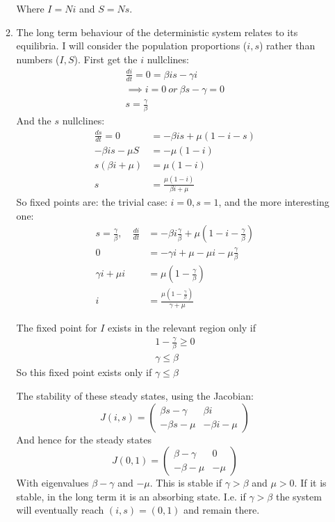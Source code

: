 \documentclass{/home/janmebows/Documents/LatexTemplates/myassignment}
\newcommand{\odd}[2]{\frac{d#1}{d#2}}
\begin{document}
\begin{enumerate}
\begin{enumerate}[label=(\roman*)]
		Where $I = Ni$ and $S = Ns$.
		\item %
			The long term behaviour of the deterministic system relates to its equilibria. I will consider the population proportions ($i,s$) rather than numbers ($I,S$).
			First get the $i$ nullclines:
			\begin{align*}
				\odd it = 0=\beta is -\gamma i\\
				\implies i=0 \ or \ \beta s - \gamma =0\\
				s = \frac{\gamma}{\beta}
			\end{align*}
			And the $s$ nullclines:
			\begin{align*}
				\odd st = 0 &= -\beta is+ \mu(1-i-s)\\
				-\beta is - \mu S &= -\mu(1-i)\\
				s(\beta i + \mu) &= \mu(1-i)\\
				s &= \frac{\mu(1-i)}{\beta i + \mu}
			\end{align*}
			So fixed points are: the trivial case: $i=0, s=1$, and the more interesting one:
			\begin{align*}
				s = \frac{\gamma}{\beta}, \quad \odd it &= -\beta i\frac{\gamma}{\beta} + \mu(1-i-\frac{\gamma}{\beta})\\
				0 &=-\gamma i + \mu  - \mu i - \mu\frac{\gamma}{\beta}\\
				\gamma i + \mu i &= \mu(1 - \frac{\gamma}{\beta})\\
				i &= \frac{\mu\left(1 - \frac{\gamma}{\beta}\right)}{\gamma + \mu}
			\end{align*}
			
			The fixed point for $I$ exists in the relevant region only if
			\begin{align*}
				1 - \frac{\gamma}{\beta} \geq0\\
				\gamma \leq \beta
			\end{align*}
			So this fixed point exists only if $\gamma \leq \beta$

			The stability of these steady states, using the Jacobian:
			\[J(i,s) = \begin{pmatrix}
				\beta s - \gamma & \beta i\\
				-\beta s - \mu &-\beta i - \mu
			\end{pmatrix}\]
			And hence for the steady states
			\[J(0,1) = \begin{pmatrix}
				\beta - \gamma & 0\\
				-\beta - \mu & -\mu
			\end{pmatrix}\]
			With eigenvalues $\beta- \gamma$ and $-\mu$. This is stable if $\gamma > \beta$ and $\mu > 0$. If it is stable, in the long term it is an absorbing state. I.e. if $\gamma > \beta$ the system will eventually reach $(i,s) = (0,1)$ and remain there.


\end{enumerate}
\end{enumerate}
\end{document}
